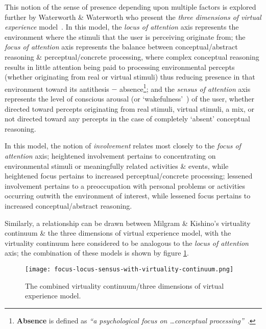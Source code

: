 \newcommand{\absencefootnote}{\footnote{\textbf{Absence} is defined as \textit{``a psychological focus on \ldots conceptual processing''}~\cite{Waterworth2001}.}}

This notion of the sense of presence depending upon multiple factors is explored further by Waterworth \& Waterworth who present the \textit{three dimensions of virtual experience} model~\cite{Waterworth2001}. In this model, the \textit{locus of attention} axis represents the environment where the stimuli that the user is perceiving originate from; the \textit{focus of attention} axis represents the balance between conceptual/abstract reasoning \& perceptual/concrete processing, where complex conceptual reasoning results in little attention being paid to processing environmental percepts (whether originating from real or virtual stimuli) thus reducing presence\presencefootnote{} in that environment toward its antithesis $-$ absence\absencefootnote{}; and the \textit{sensus of attention} axis represents the level of conscious arousal (or `wakefulness'~\cite{Laureys2009}) of the user, whether directed toward percepts originating from real stimuli, virtual stimuli, a mix, or not directed toward any percepts in the case of completely `absent' conceptual reasoning.

In this model, the notion of \textit{involvement} relates most closely to the \textit{focus of attention} axis; heightened involvement pertains to concentrating on environmental stimuli or meaningfully related activities \& events, while heightened focus pertains to increased perceptual/concrete processing; lessened involvement pertains to a preoccupation with personal problems or activities occurring outwith the environment of interest, while lessened focus pertains to increased conceptual/abstract reasoning.

Similarly, a relationship can be drawn between Milgram \& Kishino's virtuality continuum \& the three dimensions of virtual experience model, with the virtuality continuum here considered to be analogous to the \textit{locus of attention} axis; the combination of these models is shown by figure \ref{focus-locus-sensus-with-virtuality-continuum}.

\begin{figure}[h]
	\begin{center}
		\texttt{[image: focus-locus-sensus-with-virtuality-continuum.png]}
		\caption{The combined virtuality continuum/three dimensions of virtual experience model.}
		\label{focus-locus-sensus-with-virtuality-continuum}
	\end{center}	
\end{figure}

